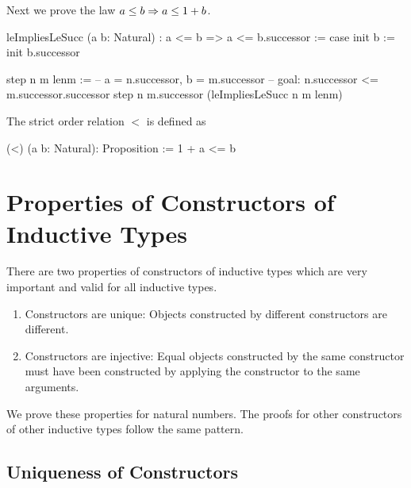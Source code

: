 \noindent Next we prove the law $a \le b \Rightarrow a \le 1 + b$.

\begin{alba}
    leImpliesLeSucc
        (a b: Natural)
        :  a <= b  =>  a <= b.successor
    :=
        case
            init b :=
                init b.successor

            step n m lenm :=
                -- a = n.successor, b = m.successor
                -- goal: n.successor <= m.successor.successor
                step
                    n
                    m.successor
                    (leImpliesLeSucc n m lenm)
\end{alba}


\noindent The strict order relation $<$ is defined as

\begin{alba}
  (<) (a b: Natural): Proposition :=
    1 + a <= b
\end{alba}











\section{Properties of Constructors of Inductive Types}

There are two properties of constructors of inductive types which are very
important and valid for all inductive types.

\begin{enumerate}

\item Constructors are unique: Objects constructed by
different constructors are different.

\item Constructors are injective: Equal objects constructed by the same
constructor must have been constructed by applying the constructor to the same
arguments.

\end{enumerate}

We prove these properties for natural numbers. The proofs for other constructors
of other inductive types follow the same pattern.




\subsection{Uniqueness of Constructors}

